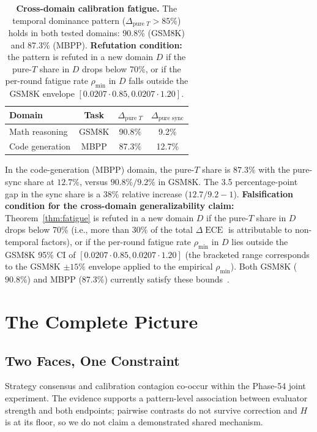 \documentclass[11pt]{article}
\DeclareMathOperator{\ECE}{ECE}
\begin{document}
\begin{table}[H]
\centering
\caption{\textbf{Cross-domain calibration fatigue.} The temporal dominance pattern ($\Delta_{\text{pure } T} > 85\%$) holds in both tested domains: 90.8\% (GSM8K) and 87.3\% (MBPP). \textbf{Refutation condition:} the pattern is refuted in a new domain $D$ if the pure-$T$ share in $D$ drops below 70\%, or if the per-round fatigue rate $\rho_{\min}$ in $D$ falls outside the GSM8K envelope $[0.0207 \cdot 0.85, 0.0207 \cdot 1.20]$.}
\begin{tabular}{@{}lccc@{}}
\toprule
Domain & Task & $\Delta_{\text{pure } T}$ & $\Delta_{\text{pure sync}}$ \\
\midrule
Math reasoning & GSM8K & 90.8\% & 9.2\% \\
Code generation & MBPP & 87.3\% & 12.7\% \\
\bottomrule
\end{tabular}
\end{table}

In the code-generation (MBPP) domain, the pure-$T$ share is $87.3\%$ with the pure-sync share at $12.7\%$, versus $90.8\% / 9.2\%$ in GSM8K. The 3.5 percentage-point gap in the sync share is a 38\% relative increase ($12.7 / 9.2 - 1$). \textbf{Falsification condition for the cross-domain generalizability claim:} Theorem~\ref{thm:fatigue} is refuted in a new domain $D$ if the pure-$T$ share in $D$ drops below 70\% (i.e., more than 30\% of the total $\Delta\ECE$ is attributable to non-temporal factors), or if the per-round fatigue rate $\rho_{\min}$ in $D$ lies outside the GSM8K 95\% CI of $[0.0207 \cdot 0.85, 0.0207 \cdot 1.20]$ (the bracketed range corresponds to the GSM8K $\pm 15\%$ envelope applied to the empirical $\rho_{\min}$). Both GSM8K ($90.8\%$) and MBPP ($87.3\%$) currently satisfy these bounds~\citep{sun2020test,liu2026temporal}.

\section{The Complete Picture}

\subsection{Two Faces, One Constraint}

Strategy consensus and calibration contagion co-occur within the Phase-54 joint experiment. The evidence supports a pattern-level association between evaluator strength and both endpoints; pairwise contrasts do not survive correction and $H$ is at its floor, so we do not claim a demonstrated shared mechanism.
\end{document}
